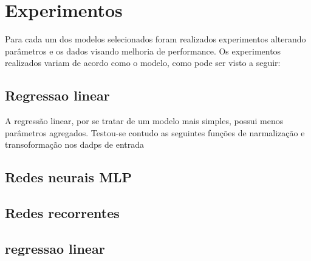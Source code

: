 
\chapter{Experimentos}

Para cada um dos modelos selecionados foram realizados experimentos
alterando parâmetros e os dados visando melhoria de performance. Os experimentos
realizados variam de acordo como o modelo, como pode ser visto a seguir:

\section{Regressao linear}

A regressão linear, por se tratar de um modelo mais simples, possui menos
parâmetros agregados. Testou-se contudo as seguintes funções de narmalização e 
transoformação
nos dadps de entrada

\section{Redes neurais MLP}
\section{Redes recorrentes}
\section{regressao linear}